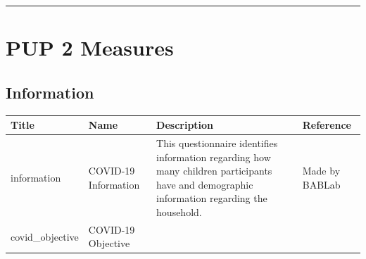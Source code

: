 \documentclass[]{book}
\begin{document}
\begin{center}\rule{0.5\linewidth}{0.5pt}\end{center}

\hypertarget{pup-2-measures}{%
\section{PUP 2 Measures}\label{pup-2-measures}}

\hypertarget{information-1}{%
\subsection{Information}\label{information-1}}

\begin{longtable}[]{@{}llll@{}}
\toprule
\begin{minipage}[b]{0.14\columnwidth}\raggedright
Title\strut
\end{minipage} & \begin{minipage}[b]{0.22\columnwidth}\raggedright
Name\strut
\end{minipage} & \begin{minipage}[b]{0.30\columnwidth}\raggedright
Description\strut
\end{minipage} & \begin{minipage}[b]{0.24\columnwidth}\raggedright
Reference\strut
\end{minipage}\tabularnewline
\midrule
\endhead
\begin{minipage}[t]{0.14\columnwidth}\raggedright
information\strut
\end{minipage} & \begin{minipage}[t]{0.22\columnwidth}\raggedright
COVID-19 Information\strut
\end{minipage} & \begin{minipage}[t]{0.30\columnwidth}\raggedright
This questionnaire identifies information regarding how many children participants have and demographic information regarding the household.\strut
\end{minipage} & \begin{minipage}[t]{0.24\columnwidth}\raggedright
Made by BABLab\strut
\end{minipage}\tabularnewline
\begin{minipage}[t]{0.14\columnwidth}\raggedright
covid\_objective\strut
\end{minipage} & \begin{minipage}[t]{0.22\columnwidth}\raggedright
COVID-19 Objective\strut
\end{minipage} & \begin{minipage}[t]{0.30\columnwidth}\raggedright

\end{minipage}
\end{longtable}
\end{document}
